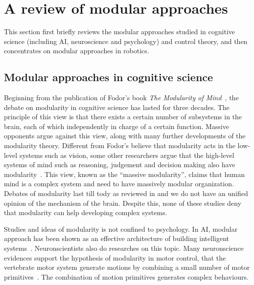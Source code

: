 \section{A review of modular approaches}
\label{cha2:sec3}
This section first briefly reviews the modular approaches studied in cognitive science (including AI, neuroscience and psychology) and control theory, and then concentrates on modular approaches in robotics.

\subsection{Modular approaches in cognitive science}
\label{cha2:sec3:cognitive}

Beginning from the publication of Fodor's book \textit{The Modularity of Mind}~\citep{fodor1983modularity}, the debate on modularity in cognitive science has lasted for three decades. The principle of this view is that there exists a certain number of subsystems in the brain, each of which independently in charge of a certain function. Massive opponents argue against this view, along with many further developments of the modularity theory. Different from Fodor's believe that modularity acts in the low-level systems such as vision, some other researchers argue that the high-level systems of mind such as reasoning, judgement and decision making also have modularity~\citep{samuels2000massively,carruthers2006architecture}. This view, known as the ``massive modularity'', claims that human mind is a complex system and need to have massively modular organization. Debates of modularity last till tody as reviewed in \citet{barrett2006modularity} and we do not have an unified opinion of the mechanism of the brain. Despite this, none of these studies deny that modularity can help developing complex systems.

Studies and ideas of modularity is not confined to psychology. In AI, modular approach has been shown as an effective architecture of building intelligent systems~\citep{bryson2004modular,BrysonMcG12}. Neuronscientists also do researches on this topic. Many neuronscience evidences support the hypothesis of modularity in motor control, that the vertebrate motor system generate motions by combining a small number of motor primitives~\citep{mussa1994linear,mussa1999modular,bizzi2008combining,grillner2011control}. The combination of motion primitives generates complex behaviours.

